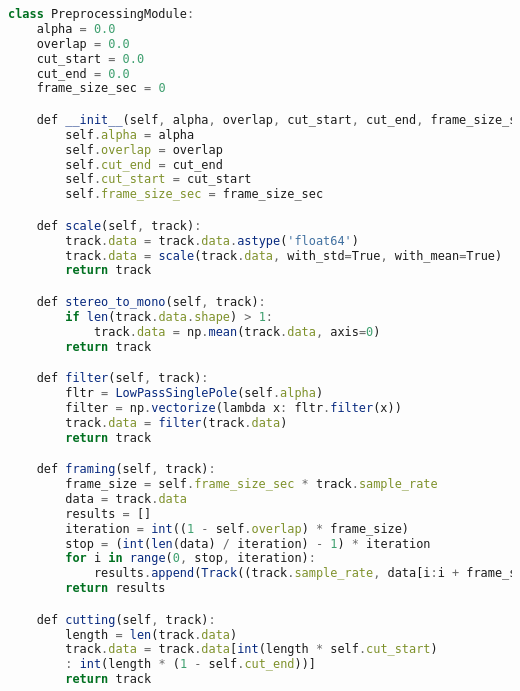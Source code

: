 \newpage
{}

\begin{lstlisting}[language=TypeScript, basicstyle=\small\ttfamily]
class PreprocessingModule:
    alpha = 0.0
    overlap = 0.0
    cut_start = 0.0
    cut_end = 0.0
    frame_size_sec = 0

    def __init__(self, alpha, overlap, cut_start, cut_end, frame_size_sec):
        self.alpha = alpha
        self.overlap = overlap
        self.cut_end = cut_end
        self.cut_start = cut_start
        self.frame_size_sec = frame_size_sec

    def scale(self, track):
        track.data = track.data.astype('float64')
        track.data = scale(track.data, with_std=True, with_mean=True)
        return track

    def stereo_to_mono(self, track):
        if len(track.data.shape) > 1:
            track.data = np.mean(track.data, axis=0)
        return track

    def filter(self, track):
        fltr = LowPassSinglePole(self.alpha)
        filter = np.vectorize(lambda x: fltr.filter(x))
        track.data = filter(track.data)
        return track

    def framing(self, track):
        frame_size = self.frame_size_sec * track.sample_rate
        data = track.data
        results = []
        iteration = int((1 - self.overlap) * frame_size)
        stop = (int(len(data) / iteration) - 1) * iteration
        for i in range(0, stop, iteration):
            results.append(Track((track.sample_rate, data[i:i + frame_size]), track.label))
        return results

    def cutting(self, track):
        length = len(track.data)
        track.data = track.data[int(length * self.cut_start)
        : int(length * (1 - self.cut_end))]
        return track
\end{lstlisting}

\newpage

